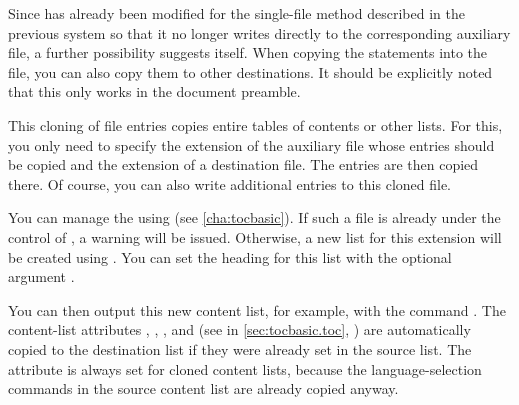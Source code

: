 Since  has already been modified for
the single-file method described in the previous system so that it no longer
writes directly to the corresponding auxiliary file, a further possibility
suggests itself. When copying the  statements into the
 file, you can also copy them to other destinations. It should be
explicitly noted that this only works in the document preamble.

\begin{Declaration}
\end{Declaration}
This cloning of file entries copies entire tables of contents or other lists.
For this, you only need to specify the extension of the auxiliary file whose
entries should be copied and the extension of a destination file. The entries
are then copied there. Of course, you can also write additional entries to
this cloned file.

You can manage the  using
\hyperref[cha:tocbasic]{}%
 (see
\autoref{cha:tocbasic}). If such a file is already under the control of
\hyperref[cha:tocbasic]{}, a warning will be issued.
Otherwise, a new list for this extension will be created using
\hyperref[cha:tocbasic]{}. You can set the heading for this
list with the optional argument .

You can then output this new content list, for example, with the command
. The content-list
attributes
, , , and 
(see  in \autoref{sec:tocbasic.toc},
) are automatically copied to the
destination list if they were already set in the source list. The
 attribute is always set for cloned content lists, because the
language-selection commands in the source content list are already copied
anyway.


